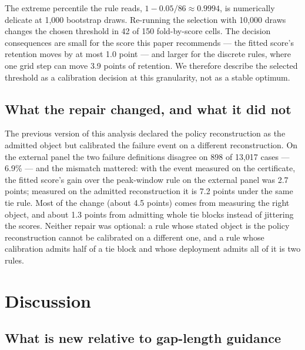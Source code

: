 \documentclass[draft]{agujournal2025}
\begin{document}
The extreme percentile the rule reads, $1-0.05/86\approx0.9994$, is numerically
delicate at 1{,}000 bootstrap draws. Re-running the selection with 10{,}000
draws changes the chosen threshold in 42 of 150 fold-by-score cells. The decision
consequences are small for the score this paper recommends --- the fitted score's
retention moves by at most 1.0 point --- and larger for the discrete rules, where
one grid step can move 3.9 points of retention. We therefore describe the
selected threshold as a calibration decision at this granularity, not as a
stable optimum.

\subsection{What the repair changed, and what it did not}

The previous version of this analysis declared the policy reconstruction as the
admitted object but calibrated the failure event on a different reconstruction.
On the external panel the two failure definitions disagree on 898 of 13{,}017
cases --- 6.9\% --- and the mismatch mattered: with the event measured on the
certificate, the fitted score's gain over the peak-window rule on the external
panel was 2.7 points; measured on the admitted reconstruction it is 7.2 points
under the same tie rule. Most of the change (about 4.5 points) comes from
measuring the right object, and about 1.3 points from admitting whole tie blocks
instead of jittering the scores. Neither repair was optional: a rule whose stated
object is the policy reconstruction cannot be calibrated on a different one, and
a rule whose calibration admits half of a tie block and whose deployment admits
all of it is two rules.

\section{Discussion}

\subsection{What is new relative to gap-length guidance}
\end{document}
